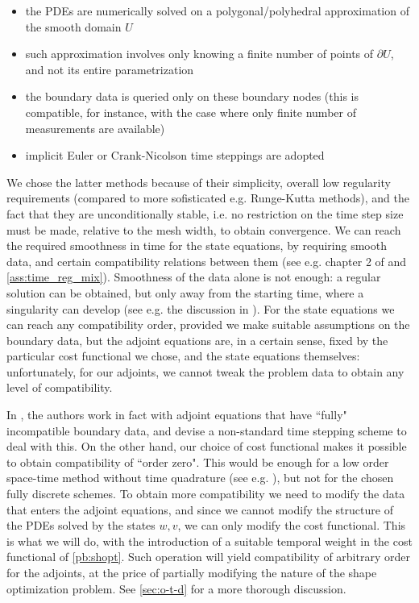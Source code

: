 \documentclass[english,a4paper,9pt,oneside]{scrbook}	%
\theoremstyle{break}
\theoremstyle{remark}
\begin{document}
\begin{itemize}
	\item the PDEs are numerically solved on a polygonal/polyhedral approximation of the smooth domain $U$
	\item such approximation involves only knowing a finite number of points of $\partial U$, and not its entire parametrization
	\item the boundary data is queried only on these boundary nodes (this is compatible, for instance, with the case where only finite number of measurements are available)
	\item implicit Euler or Crank-Nicolson time steppings are adopted
\end{itemize}

We chose the latter methods because of their simplicity, overall low regularity requirements (compared to more sofisticated e.g. Runge-Kutta methods), and the fact that they are unconditionally stable, i.e. no restriction on the time step size must be made, relative to the mesh width, to obtain convergence. 
We can reach the required smoothness in time for the state equations, by requiring smooth data, and certain compatibility relations between them (see e.g. chapter 2 of \cite{lions} and \cref{ass:time_reg_mix}). Smoothness of the data alone is not enough: a regular solution can be obtained, but only away from the starting time, where a singularity can develop (see e.g. the discussion in \cite{harbrecht}). For the state equations we can reach any compatibility order, provided we make suitable assumptions on the boundary data, but the adjoint equations are, in a certain sense, fixed by the particular cost functional we chose, and the state equations themselves: unfortunately, for our adjoints, we cannot tweak the problem data to obtain any level of compatibility.

In \cite{harbrecht}, the authors work in fact with adjoint equations that have ``fully" incompatible boundary data, and devise a non-standard time stepping scheme to deal with this. On the other hand, our choice of cost functional makes it possible to obtain compatibility of ``order zero". This would be enough for a low order space-time method without time quadrature (see e.g. \cite{vexler}), but not for the chosen fully discrete schemes. To obtain more compatibility we need to modify the data that enters the adjoint equations, and since we cannot modify the structure of the PDEs solved by the states $w,v$, we can only modify the cost functional. This is what we will do, with the introduction of a suitable temporal weight in the cost functional of \cref{pb:shopt}. Such operation will yield compatibility of arbitrary order for the adjoints, at the price of partially modifying the nature of the shape optimization problem. See \cref{sec:o-t-d} for a more thorough discussion.
\end{document}
